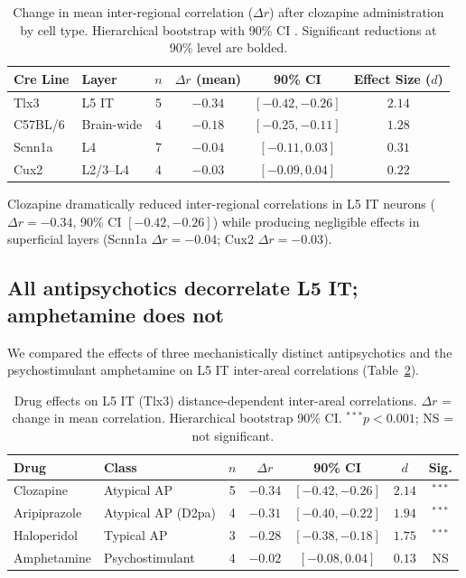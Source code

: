 \documentclass[11pt]{article}
\begin{document}
\begin{table}[H]
\centering
\caption{Change in mean inter-regional correlation ($\Delta r$) after clozapine administration by cell type. Hierarchical bootstrap with 90\% CI \citep{efron1993bootstrap}. Significant reductions at 90\% level are bolded.}
\label{tab:cloz_corr}
\begin{tabular}{llcccc}
\toprule
\textbf{Cre Line} & \textbf{Layer} & \textbf{$n$} & \textbf{$\Delta r$ (mean)} & \textbf{90\% CI} & \textbf{Effect Size ($d$)} \\
\midrule
Tlx3 & L5 IT & 5 & $\mathbf{-0.34}$ & $[-0.42, -0.26]$ & $2.14$ \\
C57BL/6 & Brain-wide & 4 & $\mathbf{-0.18}$ & $[-0.25, -0.11]$ & $1.28$ \\
Scnn1a & L4 & 7 & $-0.04$ & $[-0.11, 0.03]$ & $0.31$ \\
Cux2 & L2/3--L4 & 4 & $-0.03$ & $[-0.09, 0.04]$ & $0.22$ \\
\bottomrule
\end{tabular}
\end{table}

Clozapine dramatically reduced inter-regional correlations in L5 IT neurons ($\Delta r = -0.34$, 90\% CI $[-0.42, -0.26]$) while producing negligible effects in superficial layers (Scnn1a $\Delta r = -0.04$; Cux2 $\Delta r = -0.03$).

\subsection{All antipsychotics decorrelate L5 IT; amphetamine does not}

We compared the effects of three mechanistically distinct antipsychotics and the psychostimulant amphetamine on L5 IT inter-areal correlations (Table~\ref{tab:drug_comparison}).

\begin{table}[H]
\centering
\caption{Drug effects on L5 IT (Tlx3) distance-dependent inter-areal correlations. $\Delta r$ = change in mean correlation. Hierarchical bootstrap 90\% CI. $^{***}p < 0.001$; NS = not significant.}
\label{tab:drug_comparison}
\begin{tabular}{llccccc}
\toprule
\textbf{Drug} & \textbf{Class} & \textbf{$n$} & \textbf{$\Delta r$} & \textbf{90\% CI} & \textbf{$d$} & \textbf{Sig.} \\
\midrule
Clozapine & Atypical AP & 5 & $\mathbf{-0.34}$ & $[-0.42, -0.26]$ & $2.14$ & $^{***}$ \\
Aripiprazole & Atypical AP (D2pa) & 4 & $\mathbf{-0.31}$ & $[-0.40, -0.22]$ & $1.94$ & $^{***}$ \\
Haloperidol & Typical AP & 3 & $\mathbf{-0.28}$ & $[-0.38, -0.18]$ & $1.75$ & $^{***}$ \\
Amphetamine & Psychostimulant & 4 & $-0.02$ & $[-0.08, 0.04]$ & $0.13$ & NS \\
\bottomrule
\end{tabular}
\end{table}
\end{document}
